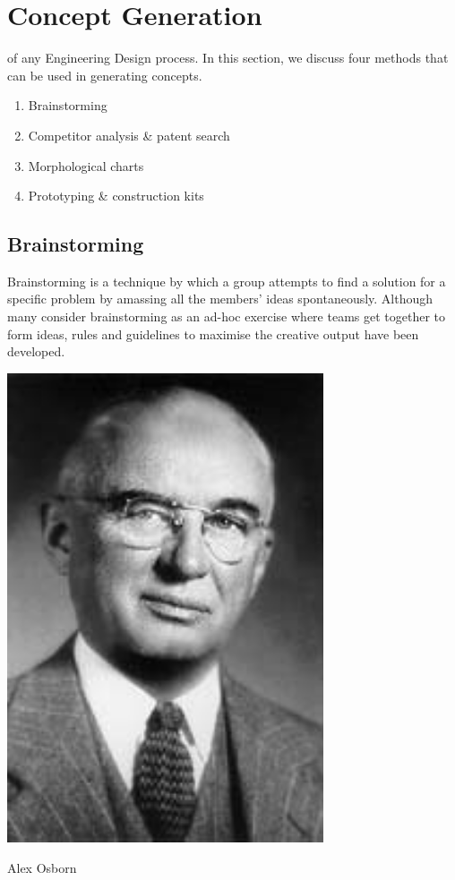 \section{Concept Generation}\label{sec-concept-generation}

 of any Engineering Design process. In this section, we discuss four methods that can be used in generating concepts.

\begin{enumerate}
    \item Brainstorming
    \item Competitor analysis \& patent search
    \item Morphological charts
    \item Prototyping \& construction kits
\end{enumerate}

\subsection{Brainstorming}

Brainstorming is a technique by which a group attempts to find a solution for a specific problem by amassing all the members' ideas spontaneously. Although many consider brainstorming as an ad-hoc exercise where teams get together to form ideas, rules and guidelines to maximise the creative output have been developed.

\begin{marginfigure}
    \centering
    \includegraphics[width=0.7\textwidth]{05_concept_generation/osborn.jpg}
    \caption[Alex Osborn]{Alex Osborn}
    \label{fig-osborn}
\end{marginfigure}

